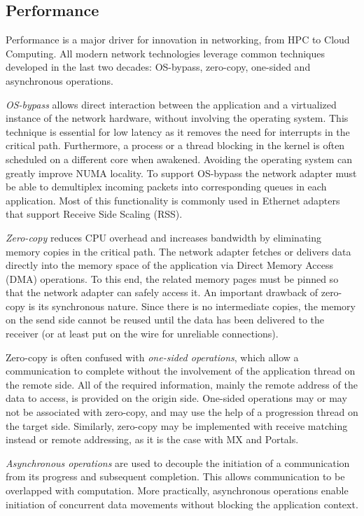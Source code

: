 \subsection{Performance}
Performance is a major driver for innovation in networking, from HPC to 
Cloud Computing. All modern network technologies leverage common techniques 
developed in the last two decades: OS-bypass, zero-copy, one-sided and asynchronous operations.

\emph{OS-bypass} allows direct interaction between the application and 
a virtualized instance of the network hardware, without involving the 
operating system. 
This technique is essential for low latency as it removes the need for 
interrupts in the critical path. Furthermore, a process or a thread blocking 
in the kernel is often scheduled on a different core when awakened. Avoiding the 
operating system can greatly improve NUMA locality. 
To support OS-bypass the network adapter must be able to demultiplex incoming 
packets into corresponding queues in each application. Most of this 
functionality is commonly used in Ethernet adapters that support Receive Side 
Scaling (RSS).

\emph{Zero-copy} reduces CPU overhead and increases bandwidth by eliminating 
memory copies in the critical path. The network adapter fetches or delivers 
data directly into the memory space of the application via Direct Memory Access 
(DMA) operations. To this end, the related memory pages must be pinned so 
that the network adapter can safely access it. 
An important drawback of zero-copy is its synchronous nature. Since there is 
no intermediate copies, the memory on the send side cannot be reused until 
the data has been delivered to the receiver (or at least put on 
the wire for unreliable connections).

Zero-copy is often confused with \emph{one-sided operations}, which allow a 
communication to complete without the involvement of the application thread 
on the remote side. All of the required information, mainly the remote address 
of the data to access, is provided on the origin side. One-sided operations 
may or may not be associated with zero-copy, and may use the help of a 
progression thread on the target side. Similarly, zero-copy may be implemented 
with receive matching instead or remote addressing, as it is the case with MX 
and Portals.

\emph{Asynchronous operations} are used to decouple the initiation of a 
communication from its progress and subsequent completion. This allows communication to be 
overlapped with computation. 
More practically, asynchronous operations enable initiation of concurrent 
data movements without blocking the application context.

